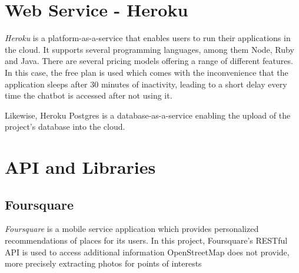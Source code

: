 \section{Web Service - Heroku}
\textit{Heroku} \cite{heroku} is a platform-as-a-service that enables users to run their applications in the cloud. It supports several programming languages, among them Node, Ruby and Java. There are several pricing models offering a range of different features. In this case, the free plan is used which comes with the inconvenience that the application sleeps after 30 minutes of inactivity, leading to a short delay every time the chatbot is accessed after not using it.

Likewise, Heroku Postgres is a database-as-a-service enabling the upload of the project’s database into the cloud. 

\section{API and Libraries}
\subsection{Foursquare}
\textit{Foursquare} \cite{foursquare} is a mobile service application which provides personalized recommendations of places for its users. In this project, Foursquare’s RESTful API is used to access additional information OpenStreetMap does not provide, more precisely extracting photos for points of interests